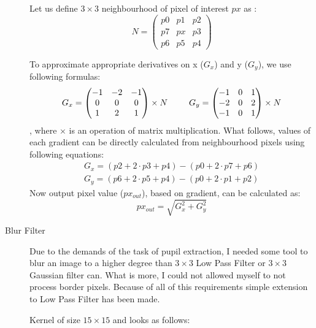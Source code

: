 \documentclass{article}
\begin{document}
\begin{description}
Let us define $3 \times 3$ neighbourhood of pixel of interest $px$ as :
\[
N = 
\begin{pmatrix}
  p0 & p1 & p2 \\
  p7 & px & p3 \\
  p6 & p5 & p4
\end{pmatrix}
\]

To approximate appropriate derivatives on x ($G_x$) and y ($G_y$), we use following formulas:
\[
G_x =
\begin{pmatrix}
  -1 & -2 & -1 \\
   0 & 0 & 0 \\
   1 & 2 & 1
\end{pmatrix}
\times
N
\hskip 2.5em
G_y =
\begin{pmatrix}
  -1 & 0 & 1 \\
   -2 & 0 & 2 \\
   -1 & 0 & 1
\end{pmatrix}
\times
N
\]
, where $\times$ is an operation of matrix multiplication. What follows, values of each gradient can be directly calculated from neighbourhood pixels using following equations:
\[
\begin{split}
G_x = (p2 + 2 \cdot p3 + p4) - (p0 + 2 \cdot p7 + p6) \\
G_y = (p6 + 2 \cdot p5 + p4) - (p0 + 2 \cdot p1 + p2)
\end{split}
\]
Now output pixel value ($px_{out}$), based on gradient, can be calculated as:
\[
px_{out} = \sqrt{G_x^2 + G_y^2}
\]

\pagebreak

\item[Blur Filter]
Due to the demands of the task of pupil extraction, I needed some tool to blur an image to a higher degree than $3 \times 3$ Low Pass Filter or $3 \times 3$ Gaussian filter can. What is more, I could not allowed myself to not process border pixels. Because of all of this requirements simple extension to Low Pass Filter has been made.

Kernel of size $15 \times 15$ and looks as follows:
 

\end{description}
\end{document}
